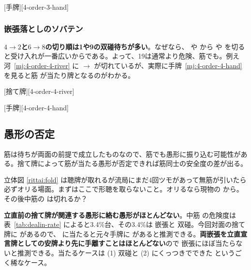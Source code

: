 \documentclass[../nankiru_main.tex]{subfiles}
\begin{document}
[手牌][4-order-3-hand]

\subsubsection*{嵌張落としのソバテン} 

\textbf{$4\to2$と$6\to8$の切り順は1や9の双碰待ちが多い}\citep[][pp.~95--96]{takizawa-yomi}。なぜなら、 や  から  や  を切ると受け入れが一番広いからである。よって、19は通常より危険、筋でも。例え河~\ref{mj:4-order-4-river} に  $\to$  が切れているが、実際に手牌~\ref{mj:4-order-4-hand} を見ると筋  が当たり牌となるのがわかる。

[捨て牌][4-order-4-river]

[手牌][4-order-4-hand]

\subsection{愚形の否定}

筋は待ちが両面の前提で成立したものなので、筋でも愚形に振り込む可能性がある。捨て牌によって筋が当たる愚形が否定できれば筋同士の安全度の差が出る。

\begin{rittai}[h]
  \centering
  
  
  \caption{親の立直に対してオリていく場面}
  \label{rittai:fold}
\end{rittai}

立体図 \ref{rittai:fold} は聴牌が取れるが流局にまだ4回ツモがあって無筋が引いたら必ずオリる場面。まずはここで形聴を取らないこと。オリるなら現物の  から。その後中筋の  は切れるか？

\textbf{立直前の捨て牌が関連する愚形に絡む愚形がほとんどない}\citep{shibukawa-gukei}。中筋  の危険度は表~\ref{tab:dealin-rate} によると3.4\%台、その3.4\%は  嵌張と  双碰。今回対面の捨て牌に  があるので、 に当たると元々手牌に  があると推測できる。\textbf{両嵌張を立直宣言牌としての安牌より先に手離すことはほとんどない}ので  嵌張にほぼ当たらないと推測できる。当たるケースは (1)  双碰と (2)  にくっつきでできた  というごく稀なケース。
\end{document}

